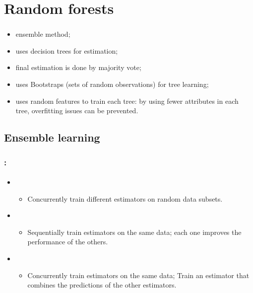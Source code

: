 \documentclass[xcolor=table]{beamer}
\begin{document}
\section{Random forests}

\begin{frame}
	\frametitle{\insertshortsubtitle}
	\framesubtitle{\insertsection}
	\begin{itemize}
		\item ensemble method;
		\item uses decision trees for estimation;
		\item final estimation is done by majority vote;
		\item uses Bootstraps (sets of random observations) for tree learning;
		\item uses random features to train each tree: by using fewer attributes in each tree, overfitting issues can be prevented.
	\end{itemize}
	
\end{frame}

\subsection{Ensemble learning}

\begin{frame}
	\frametitle{\insertshortsubtitle: \insertsection}
	\framesubtitle{\insertsubsection}
	
	\begin{itemize}
		\item {}
		\begin{itemize}
			\item Concurrently train different estimators on random data subsets.
		\end{itemize}
		\item {}
		\begin{itemize}
			\item Sequentially train estimators on the same data; each one improves the performance of the others.
		\end{itemize}
		\item {}
		\begin{itemize}
			\item Concurrently train estimators on the same data; Train an estimator that combines the predictions of the other estimators.
		\end{itemize}
	\end{itemize}
	
\end{frame}
\end{document}
